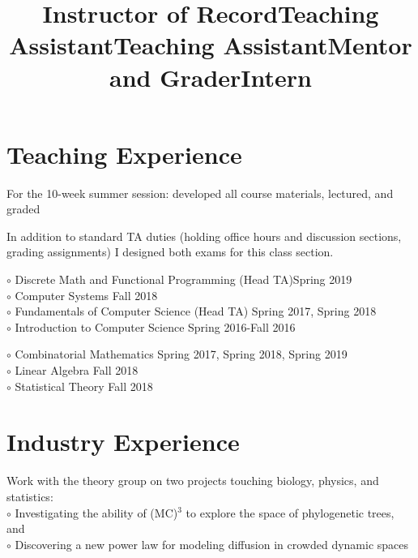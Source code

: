 \documentclass[margin]{res}
\begin{document}
\begin{resume}
\section{Teaching Experience}
\title{\textbf{Instructor of Record}}
\begin{position}
	For the 10-week summer session: developed all course materials, lectured, and graded
\end{position}

\title{\textbf{Teaching Assistant}}
\begin{position}
	In addition to standard TA duties (holding office hours and discussion sections, grading assignments) I designed both exams for this class section. 
\end{position}

\dates{}
\title{\textbf{Teaching Assistant}}
\begin{position}
$\circ$ Discrete Math and Functional Programming (Head TA)\hfill Spring 2019\\
$\circ$ Computer Systems \hfill Fall 2018\\
$\circ$ Fundamentals of Computer Science (Head TA) \hfill Spring 2017, Spring 2018\\
$\circ$ Introduction to Computer Science \hfill Spring 2016-Fall 2016

\end{position}

\dates{}
\title{\textbf{Mentor and Grader}}
\begin{position}
$\circ$ Combinatorial Mathematics \hfill Spring 2017, Spring 2018, Spring 2019\\
$\circ$ Linear Algebra \hfill Fall 2018\\
$\circ$ Statistical Theory \hfill Fall 2018

\end{position}

\section{Industry Experience}

\title{\textbf{Intern}}
\begin{position}
Work with the theory group on two projects touching biology, physics, and statistics:\\
$\circ$ Investigating the ability of (MC)$^3$ to explore the space of phylogenetic trees, and \\
$\circ$ Discovering a new power law for modeling diffusion in crowded dynamic spaces
\end{position}


\end{resume}
\end{document}
